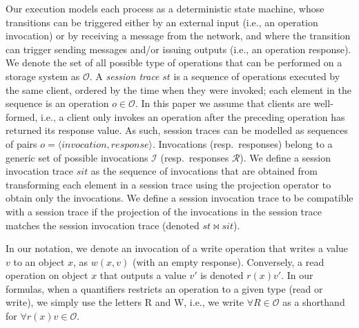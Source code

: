 \documentclass[journal,compsoc]{IEEEtran}
\begin{document}
\newtheorem{definition}{Definition}
Our execution models each process as a deterministic state machine, whose transitions can be triggered either by an external input (i.e., an operation invocation) or by receiving a message from the network, and where the transition can trigger sending messages and/or issuing outputs (i.e., an operation response). 
We denote the set of all possible type of operations that can be performed on a storage system as  $\mathcal{O}$. A \emph{session trace} $\mathit{st}$ is a sequence of operations executed by the same client, ordered by the time when they were invoked; each element in the sequence is an operation $o \in \mathcal{O}$. In this paper we assume that clients are well-formed, i.e., a client only invokes an operation after the preceding operation has returned its response value. As such, session traces can be modelled as sequences of pairs $o = \langle \textit{invocation},\textit{response}\rangle$. Invocations (resp.\ responses) belong to a generic set of possible invocations $\mathcal{I}$ (resp.\ responses $\mathcal{R}$).
We define a session invocation trace $\mathit{sit}$ as the sequence of invocations that are obtained from transforming each element in a session trace using the projection operator to obtain only the invocations. We define a session invocation trace to be compatible with a session trace if the projection of the invocations in the session trace matches the session invocation trace (denoted $st\bowtie sit$).


In our notation, we denote an invocation of a write operation that writes a value $v$ to an object $x$, as $w(x,v)$ (with an empty response). Conversely, a read operation on object $x$ that outputs a value $v'$ is denoted $r(x){v'}$. %
 \def\tuple#1{\langle #1\rangle}
In our formulas, when a quantifiers restricts an operation to a given type (read or write), we simply use the letters R and W, i.e., we write $\forall R \in \mathcal{O}$ as a shorthand for $\forall r(x){v} \in \mathcal{O}$.
\end{document}
